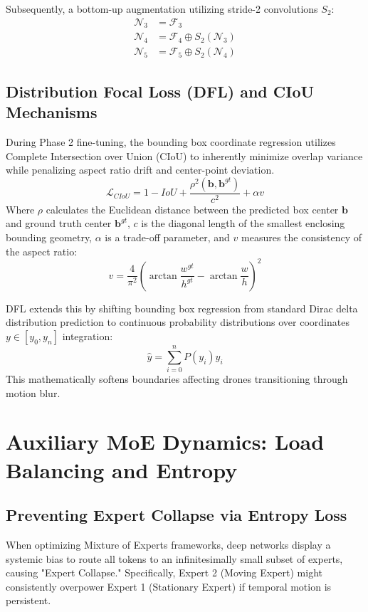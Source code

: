 \documentclass[11pt, letterpaper, oneside, openany]{book}
\begin{document}
Subsequently, a bottom-up augmentation utilizing stride-2 convolutions $S_2$:
\begin{align}
    \mathcal{N}_3 &= \mathcal{F}_3 \\
    \mathcal{N}_4 &= \mathcal{F}_4 \oplus S_2(\mathcal{N}_3) \\
    \mathcal{N}_5 &= \mathcal{F}_5 \oplus S_2(\mathcal{N}_4)
\end{align}

\section{Distribution Focal Loss (DFL) and CIoU Mechanisms}
During Phase 2 fine-tuning, the bounding box coordinate regression utilizes Complete Intersection over Union (CIoU) to inherently minimize overlap variance while penalizing aspect ratio drift and center-point deviation.
\begin{equation}
    \mathcal{L}_{CIoU} = 1 - IoU + \frac{\rho^2(\mathbf{b}, \mathbf{b}^{gt})}{c^2} + \alpha v
\end{equation}
Where $\rho$ calculates the Euclidean distance between the predicted box center $\mathbf{b}$ and ground truth center $\mathbf{b}^{gt}$, $c$ is the diagonal length of the smallest enclosing bounding geometry, $\alpha$ is a trade-off parameter, and $v$ measures the consistency of the aspect ratio:
\begin{equation}
    v = \frac{4}{\pi^2} \left( \arctan\frac{w^{gt}}{h^{gt}} - \arctan\frac{w}{h} \right)^2
\end{equation}

DFL extends this by shifting bounding box regression from standard Dirac delta distribution prediction to continuous probability distributions over coordinates $y \in [y_0, y_n]$ integration:
\begin{equation}
    \hat{y} = \sum_{i=0}^{n} P(y_i) y_i
\end{equation}
This mathematically softens boundaries affecting drones transitioning through motion blur.

\chapter{Auxiliary MoE Dynamics: Load Balancing and Entropy}

\section{Preventing Expert Collapse via Entropy Loss}
When optimizing Mixture of Experts frameworks, deep networks display a systemic bias to route all tokens to an infinitesimally small subset of experts, causing "Expert Collapse." Specifically, Expert 2 (Moving Expert) might consistently overpower Expert 1 (Stationary Expert) if temporal motion is persistent.
\end{document}
